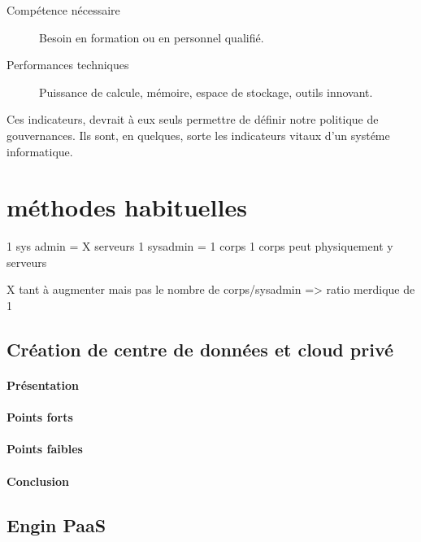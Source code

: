 \documentclass[11pt, a4paper ]{article}
\let\stdsection\section
\renewcommand\section{\newpage\stdsection}
\begin{document}
\begin{spacing}{1.5}
\begin{description}
	\item[Compétence nécessaire]
		Besoin en formation ou en personnel qualifié.

	\item[Performances techniques]
		Puissance de calcule, mémoire, espace de stockage, outils innovant.

\end{description}




Ces indicateurs, devrait à eux seuls permettre de définir notre politique de gouvernances. Ils sont, en quelques, sorte les indicateurs vitaux d'un systéme informatique.

		\section{méthodes habituelles} %

1 sys admin = X serveurs
1 sysadmin = 1 corps
1 corps peut physiquement y serveurs

X tant à augmenter mais pas le nombre de corps/sysadmin => ratio merdique de 1


			\subsection{Création de centre de données et cloud privé}
\paragraph{Présentation}

\paragraph{Points forts}

\paragraph{Points faibles}

\paragraph{Conclusion}
			
			\subsection{Engin PaaS}


\end{spacing}
\end{document}
